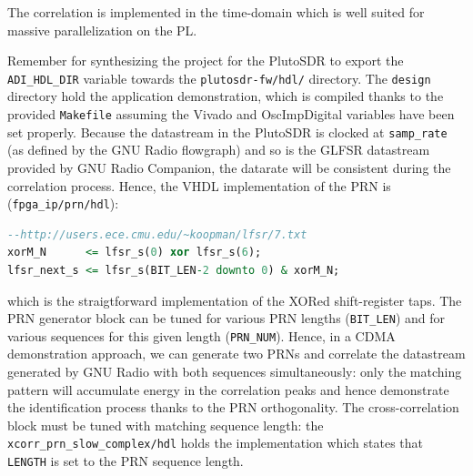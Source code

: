 \documentclass{article}
\begin{document}
The correlation is implemented in the time-domain which is well suited for massive parallelization on
the PL.

Remember for synthesizing the project for the PlutoSDR to export the {\tt ADI\_HDL\_DIR} variable
towards the {\tt plutosdr-fw/hdl/} directory. The {\tt design} directory hold the application
demonstration, which is compiled thanks to the provided {\tt Makefile} assuming the Vivado and
OscImpDigital variables have been set properly. Because the datastream in the PlutoSDR is clocked
at {\tt samp\_rate} (as defined by the GNU Radio flowgraph) and so is the GLFSR datastream
provided by GNU Radio Companion, the datarate will be consistent during the correlation process.
Hence, the VHDL implementation of the PRN is ({\tt fpga\_ip/prn/hdl}):

\begin{lstlisting}[language=VHDL]
--http://users.ece.cmu.edu/~koopman/lfsr/7.txt
xorM_N      <= lfsr_s(0) xor lfsr_s(6);
lfsr_next_s <= lfsr_s(BIT_LEN-2 downto 0) & xorM_N;
\end{lstlisting}
which is the straigtforward implementation of the XORed shift-register taps. The PRN generator
block can be tuned for various PRN lengths ({\tt BIT\_LEN}) and for various sequences
for this given length ({\tt PRN\_NUM}). Hence, in a CDMA demonstration approach, we can generate
two PRNs and correlate the datastream generated by GNU Radio with both sequences simultaneously:
only the matching pattern will accumulate energy in the correlation peaks and hence demonstrate
the identification process thanks to the PRN orthogonality. The cross-correlation block must
be tuned with matching sequence length: the {\tt xcorr\_prn\_slow\_complex/hdl} holds the 
implementation which states that {\tt LENGTH} is set to the PRN sequence length. 
\end{document}
